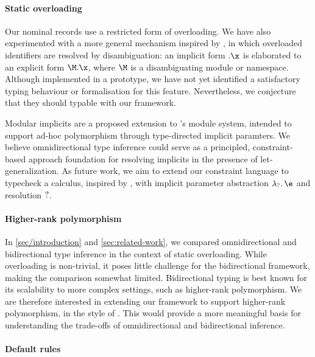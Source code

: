 \documentclass[acmsmall,screen,nonacm,review]{acmart}
\begin{document}
\paragraph{Static overloading}

Our nominal records use a restricted form of overloading.  We have also
experimented with a more general mechanism inspired by
\citet*{Leijen-Ye/prefix@pldi2025}, in which overloaded identifiers are
resolved by disambiguation: an implicit form $\eover \x$ is elaborated to an
explicit form $\exover \M \x$, where $\M$ is a disambiguating module or
namespace.
%
Although implemented in a prototype, we have not yet identified a satisfactory
typing behaviour or formalisation for this feature. Nevertheless, we conjecture
that they should typable with our framework.

Modular implicits \citep*{White-Bour-Yallop/Modular_Implicits/ml2014} are a
proposed extension to \OCaml's module system, intended to support ad-hoc
polymorphism through type-directed implicit paramters. We believe
omnidirectional type inference could serve as a principled, constraint-based
approach foundation for resolving implicits in the presence of
let-generalization.
%
As future work, we aim to extend our constraint language to typecheck a
calculus, inspired by \COCHIS \citep*{journals/jfp/SchrijversOWM19}, with
implicit parameter abstraction $\eifun \t \e$ and resolution $?\relax$.

\paragraph{Higher-rank polymorphism}

In \cref{sec/introduction} and \cref{sec:related-work}, we compared
omnidirectional and bidirectional type inference in the context of static
overloading. While overloading is non-trivial, it poses little challenge for the
bidirectional framework, making the comparison somewhat limited. Bidirectional
typing is best known for its scalability to more complex settings, such as
higher-rank polymorphism. We are therefore interested in extending our
framework to support higher-rank polymorphism, in the style of
\citet*{dunfield-krishnaswami-bidirectional-poly}. This would provide a more
meaningful basis for understanding the trade-offs of omnidirectional and
bidirectional inference.


\paragraph{Default rules}
\end{document}
